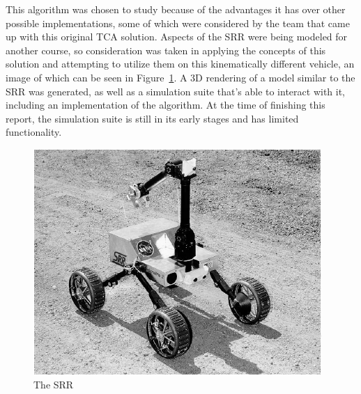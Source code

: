 This algorithm was chosen to study because of the advantages it has over other possible implementations, some of which were considered by the team that came up with this original \ac{TCA} solution. Aspects of the \ac{SRR} were being modeled for another course, so consideration was taken in applying the concepts of this solution and attempting to utilize them on this kinematically different vehicle, an image of which can be seen in Figure~\ref{traction_control:introduction:srr}. A 3D rendering of a model similar to the \ac{SRR} was generated, as well as a simulation suite that's able to interact with it, including an implementation of the algorithm. At the time of finishing this report, the simulation suite is still in its early stages and has limited functionality.

\begin{figure}[htbp]
	\centering
	\includegraphics[width=.9\textwidth]{sections/introduction/images/srr.png}
	\caption{The \acl{SRR} \cite{srr}}
	\label{traction_control:introduction:srr}
\end{figure}
